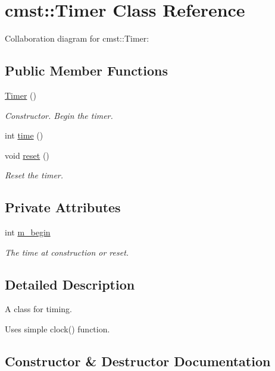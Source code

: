 \hypertarget{classcmst_1_1_timer}{}\section{cmst\+:\+:Timer Class Reference}
\label{classcmst_1_1_timer}


Collaboration diagram for cmst\+:\+:Timer\+:
\subsection*{Public Member Functions}
\begin{DoxyCompactItemize}
\item 
\hyperlink{classcmst_1_1_timer_a92455552cedec79b452d3a0f89a0e32e}{Timer} ()
\begin{DoxyCompactList}\small\item\em Constructor. Begin the timer. \end{DoxyCompactList}\item 
int \hyperlink{classcmst_1_1_timer_af0145067ee61560f2363dc4a1cb552b9}{time} ()
\item 
void \hyperlink{classcmst_1_1_timer_a8c7011cc646563211b681249df6dd4cf}{reset} ()
\begin{DoxyCompactList}\small\item\em Reset the timer. \end{DoxyCompactList}\end{DoxyCompactItemize}
\subsection*{Private Attributes}
\begin{DoxyCompactItemize}
\item 
int \hyperlink{classcmst_1_1_timer_a0fa8671c0b1dc3efca0f4dc5dfe98fc2}{m\+\_\+begin}
\begin{DoxyCompactList}\small\item\em The time at construction or reset. \end{DoxyCompactList}\end{DoxyCompactItemize}


\subsection{Detailed Description}
A class for timing.

Uses simple clock() function. 

\subsection{Constructor \& Destructor Documentation}
